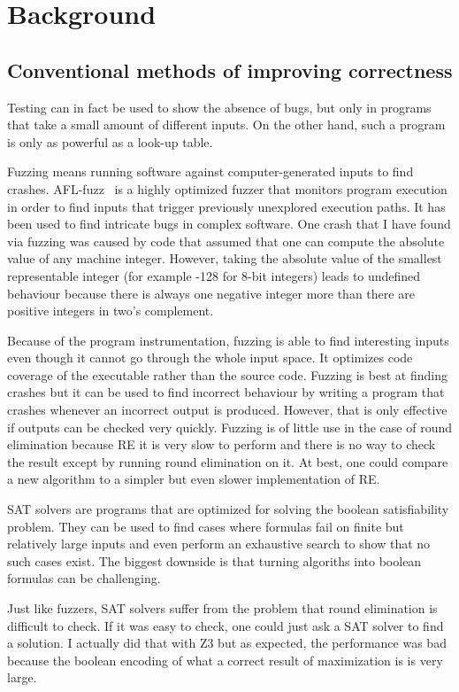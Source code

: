 \documentclass[english, 12pt, a4paper, sci, a-1b, online]{aaltothesis}
\begin{document}
\clearpage
\section{Background}

\subsection{Conventional methods of improving correctness}

Testing can in fact be used to show the absence of bugs, but only in programs that take a small amount of different inputs. On the other hand, such a program is only as powerful as a look-up table.

Fuzzing means running software against computer-generated inputs to find crashes. AFL-fuzz~\cite{AFL} is a highly optimized fuzzer that monitors program execution in order to find inputs that trigger previously unexplored execution paths. It has been used to find intricate bugs in complex software. One crash that I have found via fuzzing was caused by code that assumed that one can compute the absolute value of any machine integer. However, taking the absolute value of the smallest representable integer (for example -128 for 8-bit integers) leads to undefined behaviour because there is always one negative integer more than there are positive integers in two's complement.

Because of the program instrumentation, fuzzing is able to find interesting inputs even though it cannot go through the whole input space. It optimizes code coverage of the executable rather than the source code. Fuzzing is best at finding crashes but it can be used to find incorrect behaviour by writing a program that crashes whenever an incorrect output is produced. However, that is only effective if outputs can be checked very quickly. Fuzzing is of little use in the case of round elimination because RE it is very slow to perform and there is no way to check the result except by running round elimination on it. At best, one could compare a new algorithm to a simpler but even slower implementation of RE.\@

SAT solvers are programs that are optimized for solving the boolean satisfiability problem. They can be used to find cases where formulas fail on finite but relatively large inputs and even perform an exhaustive search to show that no such cases exist. The biggest downside is that turning algoriths into boolean formulas can be challenging.

Just like fuzzers, SAT solvers suffer from the problem that round elimination is difficult to check. If it was easy to check, one could just ask a SAT solver to find a solution. I actually did that with Z3 but as expected, the performance was bad because the boolean encoding of what a correct result of maximization is is very large.
\end{document}
